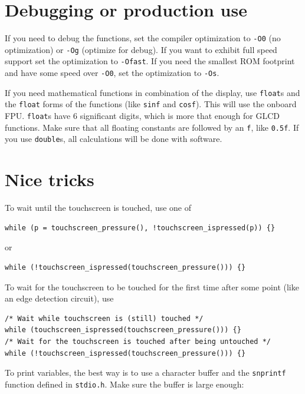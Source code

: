 \documentclass[12pt]{article}
\makeatletter
\newcommand{\ifunc}[1]{\index{#1@\texttt{#1}}}
\makeatother
\begin{document}
\section{Debugging or production use}
If you need to debug the functions, set the compiler optimization to \lstinline|-O0| (no optimization) or \lstinline|-Og| (optimize for debug). If you want to exhibit full speed support set the optimization to \lstinline|-Ofast|. If you need the smallest ROM footprint and have some speed over \lstinline|-O0|, set the optimization to \lstinline|-Os|.

If you need mathematical functions in combination of the display, use \lstinline|float|s and the \lstinline|float| forms of the functions (like \lstinline|sinf| and \lstinline|cosf|). This will use the onboard FPU. \lstinline|float|s have 6 significant digits, which is more that enough for GLCD functions. Make sure that all floating constants are followed by an \lstinline|f|, like \lstinline|0.5f|. If you use \lstinline|double|s, all calculations will be done with software.

\section{Nice tricks}
To wait until the touchscreen is touched, use one of

\begin{lstlisting}
while (p = touchscreen_pressure(), !touchscreen_ispressed(p)) {}
\end{lstlisting}

or

\begin{lstlisting}
while (!touchscreen_ispressed(touchscreen_pressure())) {}
\end{lstlisting}

To wait for the touchscreen to be touched for the first time after some point (like an edge detection circuit), use

\begin{lstlisting}
/* Wait while touchscreen is (still) touched */
while (touchscreen_ispressed(touchscreen_pressure())) {}
/* Wait for the touchscreen is touched after being untouched */
while (!touchscreen_ispressed(touchscreen_pressure())) {}
\end{lstlisting}

To print variables, the best way is to use a character buffer and the \lstinline|snprintf| \ifunc{snprintf} function defined in \lstinline|stdio.h|. Make sure the buffer is large enough:
\end{document}
